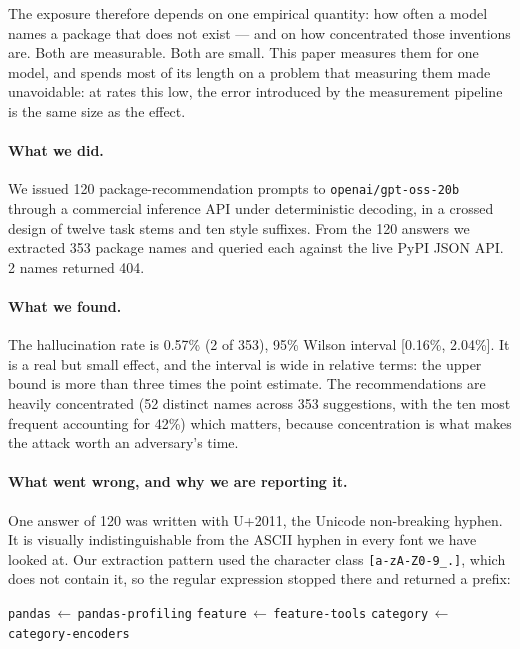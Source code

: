 \documentclass[journal]{IEEEtran}
\theoremstyle{definition}
\newcommand{\Nprompts}{120}
\newcommand{\Npkg}{353}
\newcommand{\Ndistinctpkg}{52}
\newcommand{\Nhall}{2}
\newcommand{\Rate}{0.57}
\newcommand{\Ratelo}{0.16}
\newcommand{\Ratehi}{2.04}
\newcommand{\Model}{openai/\allowbreak{}gpt-\allowbreak{}oss-\allowbreak{}20b}
\newcommand{\Conc}{42}
\begin{document}
The exposure therefore depends on one empirical quantity: how often a model
names a package that does not exist --- and on how concentrated those inventions
are. Both are measurable. Both are small. This paper measures them for one
model, and spends most of its length on a problem that measuring them made
unavoidable: at rates this low, the error introduced by the measurement pipeline
is the same size as the effect.

\paragraph{What we did.}
We issued \Nprompts{} package-recommendation prompts to \texttt{\Model} through
a commercial inference API under deterministic decoding, in a crossed design of
twelve task stems and ten style suffixes. From the \Nprompts{} answers we
extracted \Npkg{} package names and queried each against the live PyPI JSON
API. \Nhall{} names returned 404.

\paragraph{What we found.}
The hallucination rate is \Rate\% (\Nhall{} of \Npkg{}), 95\% Wilson interval
[\Ratelo\%, \Ratehi\%]. It is a real but small effect, and the interval is wide
in relative terms: the upper bound is more than three times the point estimate.
The recommendations are heavily concentrated (\Ndistinctpkg{} distinct names
across \Npkg{} suggestions, with the ten most frequent accounting for
\Conc\%) which matters, because concentration is what makes the attack worth
an adversary's time.

\paragraph{What went wrong, and why we are reporting it.}
One answer of \Nprompts{} was written with U+2011, the Unicode non-breaking
hyphen. It is visually indistinguishable from the ASCII hyphen in every font we
have looked at. Our extraction pattern used the character class
\texttt{[a-\allowbreak{}zA-\allowbreak{}Z0-\allowbreak{}9\_\allowbreak{}\-\allowbreak{}.\allowbreak{}]}, which does not contain it, so the regular expression
stopped there and returned a prefix:

\begin{center}
\texttt{pandas}\,$\leftarrow$\,\texttt{pandas-\allowbreak{}profiling}\qquad
\texttt{feature}\,$\leftarrow$\,\texttt{feature-tools}\qquad
\texttt{category}\,$\leftarrow$\,\texttt{category-\allowbreak{}encoders}
\end{center}
\end{document}
